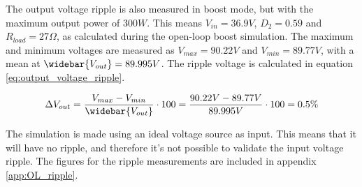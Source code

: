 The output voltage ripple is also measured in boost mode, but with the maximum output power of $300W$. This means $V_{in} = 36.9V$, $D_{2} = 0.59$ and $R_{load} = 27\Omega$, as calculated during the open-loop boost simulation. The maximum and minimum voltages are measured as $V_{max} = 90.22V$ and $V_{min} = 89.77V$, with a mean at $\widebar{V_{out}} = 89.995V$. The ripple voltage is calculated in equation \ref{eq:output_voltage_ripple}.

\begin{equation} \label{eq:output_voltage_ripple}
\Delta V_{out} = \frac{V_{max}-V_{min}}{\widebar{V_{out}}} \cdot 100 = \frac{90.22V-89.77V}{89.995V} \cdot 100 = 0.5\%
\end{equation}

The simulation is made using an ideal voltage source as input. This means that it will have no ripple, and therefore it's not possible to validate the input voltage ripple. The figures for the ripple measurements are included in appendix \ref{app:OL_ripple}.

